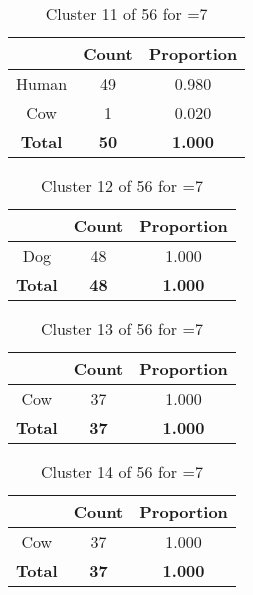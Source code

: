 \begin{table}[ht!]
\centering
\begin{tabular}{|c|c|c|}
\hline
\bf \Spec{} &\bf Count &\bf Proportion\\ \hline \hline
Human & 49 & 0.980\\ \hline
Cow & 1 & 0.020\\ \hline
\hline
\bf Total & \bf 50 & \bf 1.000\\ \hline
\end{tabular}
\label{tab:cluster:11:7}
\caption{Cluster 11 of 56 for \minneigh{}=7}
\end{table}

\begin{table}[ht!]
\centering
\begin{tabular}{|c|c|c|}
\hline
\bf \Spec{} &\bf Count &\bf Proportion\\ \hline \hline
Dog & 48 & 1.000\\ \hline
\hline
\bf Total & \bf 48 & \bf 1.000\\ \hline
\end{tabular}
\label{tab:cluster:12:7}
\caption{Cluster 12 of 56 for \minneigh{}=7}
\end{table}

\begin{table}[ht!]
\centering
\begin{tabular}{|c|c|c|}
\hline
\bf \Spec{} &\bf Count &\bf Proportion\\ \hline \hline
Cow & 37 & 1.000\\ \hline
\hline
\bf Total & \bf 37 & \bf 1.000\\ \hline
\end{tabular}
\label{tab:cluster:13:7}
\caption{Cluster 13 of 56 for \minneigh{}=7}
\end{table}

\begin{table}[ht!]
\centering
\begin{tabular}{|c|c|c|}
\hline
\bf \Spec{} &\bf Count &\bf Proportion\\ \hline \hline
Cow & 37 & 1.000\\ \hline
\hline
\bf Total & \bf 37 & \bf 1.000\\ \hline
\end{tabular}
\label{tab:cluster:14:7}
\caption{Cluster 14 of 56 for \minneigh{}=7}
\end{table}

